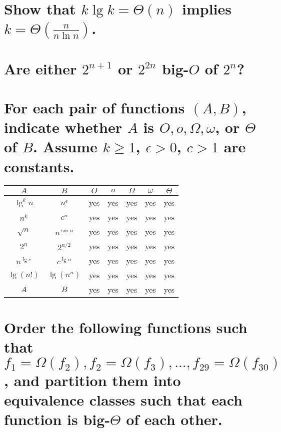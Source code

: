 \section[Problem 3]{Show that $k \lg k = \Theta(n)$ implies $k = \Theta\left(\frac{n}{n \ln n}\right)$.}

\section[Problem 4]{Are either $2^{n + 1}$ or $2^{2n}$ big-$O$ of $2^n$?}

\section[Problem 5]{For each pair of functions $(A, B)$, indicate whether $A$ is $O, o, \Omega, \omega$, or $\Theta$ of $B$. Assume $k \geq 1$, $\epsilon > 0$, $c > 1$ are constants.}

\begin{center}
	\begin{tabular}{cc|c|c|c|c|c}
		$A$ & $B$ & $O$ & $o$ & $\Omega$ & $\omega$ & $\Theta$ \\ \hline
		$\lg^k n$ & $n^{\epsilon}$ & yes & yes & yes & yes & yes \\ \hline
		$n^k$ & $c^n$ & yes & yes & yes & yes & yes \\ \hline
		$\sqrt{n}$ & $n^{\sin n}$ & yes & yes & yes & yes & yes \\ \hline
		$2^n$ & $2^{n/2}$ & yes & yes & yes & yes & yes \\ \hline
		$n^{\lg c}$ & $c^{\lg n}$ & yes & yes & yes & yes & yes \\ \hline
		$\lg(n!)$ & $\lg(n^n)$ & yes & yes & yes & yes & yes \\ \hline
		$A$ & $B$ & yes & yes & yes & yes & yes
	\end{tabular}
\end{center}

\section[Problem 6]{Order the following functions such that $f_1 = \Omega(f_2), f_2 = \Omega(f_3), ..., f_{29} = \Omega(f_{30})$, and partition them into equivalence classes such that each function is big-$\Theta$ of each other.}
